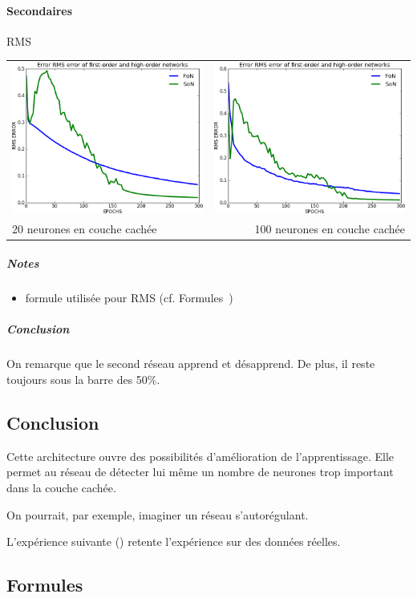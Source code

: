     \paragraph{Secondaires}
      RMS
      \begin{center}
	\begin{tabular}{lr}
	  \hspace*{-1cm}
	  \includegraphics[width=250px]{data/expC1/rms_20.png}
	  &
	  \includegraphics[width=250px]{data/expC1/rms_100.png} \\
	  
	  20 neurones en couche cachée
	  &
	  \hspace*{-1cm}
	  100 neurones en couche cachée
	\end{tabular}
      \end{center} 
      \subparagraph{Notes}
	\begin{itemize}
	  \item formule utilisée pour RMS (cf. Formules~)
	\end{itemize}
      \subparagraph{Conclusion}
	On remarque que le second réseau apprend et désapprend. De plus, il reste toujours sous la barre
	des 50\%.

  \subsection{Conclusion}
  Cette architecture ouvre des possibilités d'amélioration de l'apprentissage.
  Elle permet au réseau de détecter lui même un nombre de neurones trop important dans la couche cachée.
  
  On pourrait, par exemple, imaginer un réseau s'autorégulant.
  
  L'expérience suivante () retente l'expérience sur des données réelles.

  \newpage
  \subsection{Formules}
    
    
    


